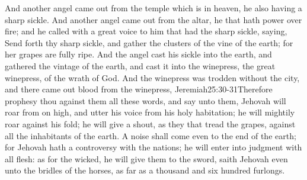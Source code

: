  And another angel came out from the temple which is in heaven, he also having a sharp sickle. 
 And another angel came out from the altar, he that hath power over fire; and he called with a great voice to him that had the sharp sickle, saying, Send forth thy sharp sickle, and gather the clusters of the vine of the earth; for her grapes are fully ripe. 
 And the angel cast his sickle into the earth, and gathered the vintage of the earth, and cast it into the winepress, the great winepress, of the wrath of God. 
 And the winepress was trodden without the city, and there came out blood from the winepress,%
				{Jeremiah}{25:30-31}{Therefore prophesy thou against them all these words, and say unto them, Jehovah will roar from on high, and utter his voice from his holy habitation; he will mightily roar against his fold; he will give a shout, as they that tread the grapes, against all the inhabitants of the earth. A noise shall come even to the end of the earth; for Jehovah hath a controversy with the nations; he will enter into judgment with all flesh: as for the wicked, he will give them to the sword, saith Jehovah}
 even unto the bridles of the horses, as far as a thousand and six hundred furlongs.